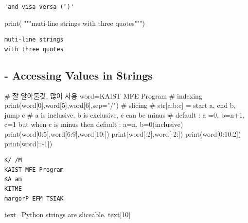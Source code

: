 \documentclass[
  a4paper,
  DIV=11,
  numbers=noendperiod]{scrreprt}
\newenvironment{Shaded}{\begin{snugshade}}{\end{snugshade}}
\newcommand{\BuiltInTok}[1]{\textcolor[rgb]{0.00,0.23,0.31}{#1}}
\newcommand{\CommentTok}[1]{\textcolor[rgb]{0.37,0.37,0.37}{#1}}
\newcommand{\DecValTok}[1]{\textcolor[rgb]{0.68,0.00,0.00}{#1}}
\newcommand{\NormalTok}[1]{\textcolor[rgb]{0.00,0.23,0.31}{#1}}
\newcommand{\OperatorTok}[1]{\textcolor[rgb]{0.37,0.37,0.37}{#1}}
\newcommand{\StringTok}[1]{\textcolor[rgb]{0.13,0.47,0.30}{#1}}
\begin{document}
\begin{verbatim}
'and visa versa (")'
\end{verbatim}

\begin{Shaded}
\begin{Highlighting}[]
\BuiltInTok{print}\NormalTok{(}
\StringTok{"""muti{-}line strings}
\StringTok{with three quotes"""}\NormalTok{)}
\end{Highlighting}
\end{Shaded}

\begin{verbatim}
muti-line strings
with three quotes
\end{verbatim}

\subsection{- Accessing Values in
Strings}\label{accessing-values-in-strings}

\begin{Shaded}
\begin{Highlighting}[]
\CommentTok{\# 잘 알아둘것, 많이 사용}
\NormalTok{word}\OperatorTok{=}\StringTok{\textquotesingle{}KAIST MFE Program\textquotesingle{}}
\CommentTok{\# indexing}
\BuiltInTok{print}\NormalTok{(word[}\DecValTok{0}\NormalTok{],word[}\DecValTok{5}\NormalTok{],word[}\DecValTok{6}\NormalTok{],sep}\OperatorTok{=}\StringTok{"/"}\NormalTok{)}
\CommentTok{\# slicing}
\CommentTok{\# str[a:b:c] = start a, end b, jump c}
\CommentTok{\# a is inclusive, b is exclusive, c can be minus}
\CommentTok{\# default : a =0, b=n+1, c=1 but when c is minus then default : a=n, b=0(inclusive)}
\BuiltInTok{print}\NormalTok{(word[}\DecValTok{0}\NormalTok{:}\DecValTok{5}\NormalTok{],word[}\DecValTok{6}\NormalTok{:}\DecValTok{9}\NormalTok{],word[}\DecValTok{10}\NormalTok{:])}
\BuiltInTok{print}\NormalTok{(word[:}\DecValTok{2}\NormalTok{],word[}\OperatorTok{{-}}\DecValTok{2}\NormalTok{:])}
\BuiltInTok{print}\NormalTok{(word[}\DecValTok{0}\NormalTok{:}\DecValTok{10}\NormalTok{:}\DecValTok{2}\NormalTok{])}
\BuiltInTok{print}\NormalTok{(word[::}\OperatorTok{{-}}\DecValTok{1}\NormalTok{])}
\end{Highlighting}
\end{Shaded}

\begin{verbatim}
K/ /M
KAIST MFE Program
KA am
KITME
margorP EFM TSIAK
\end{verbatim}

\begin{Shaded}
\begin{Highlighting}[]
\NormalTok{text}\OperatorTok{=}\StringTok{\textquotesingle{}Python strings are sliceable.\textquotesingle{}}
\NormalTok{text[}\DecValTok{10}\NormalTok{]}
\end{Highlighting}
\end{Shaded}
\end{document}
